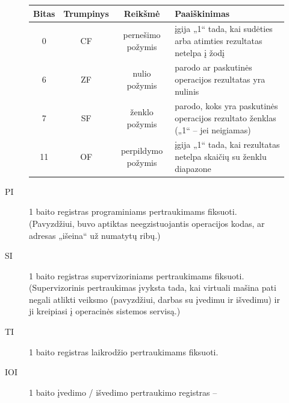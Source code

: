 \begin{description}
\begin{description}
        \begin{tabularx}{0.85\textwidth}{|c|c|c|X|}
          \hline
          Bitas & Trumpinys & Reikšmė & Paaiškinimas %
          \\
          \hline
          0 & CF & pernešimo požymis & įgija „1“ tada, kai sudėties arba
          atimties rezultatas netelpa į žodį 
          \\
          \hline
          6 & ZF & nulio požymis & parodo ar paskutinės operacijos 
          rezultatas yra nulinis %
          \\
          \hline
          7 & SF & ženklo požymis & parodo, koks yra paskutinės operacijos 
          rezultato ženklas („1“ – jei neigiamas) 
          \\
          \hline
          11 & OF & perpildymo požymis & įgija „1“ tada, kai rezultatas
          netelpa skaičių su ženklu diapazone 
          \\
          \hline
        \end{tabularx}
      \item[PI] 1 baito registras programiniams pertraukimams fiksuoti.
        (Pavyzdžiui, buvo aptiktas neegzistuojantis operacijos kodas, ar
        adresas „išeina“ už numatytų ribų.)
      \item[SI] 1 baito registras supervizoriniams pertraukimams fiksuoti.
        (Supervizorinis pertraukimas įvyksta tada, kai virtuali mašina
        pati negali atlikti veiksmo (pavyzdžiui, darbas su įvedimu ir
        išvedimu) ir ji kreipiasi į operacinės sistemos servisą.)
      \item[TI] 1 baito registras laikrodžio pertraukimams fiksuoti.
      \item[IOI] 1 baito įvedimo / išvedimo pertraukimo registras – 

\end{description}
\end{description}
